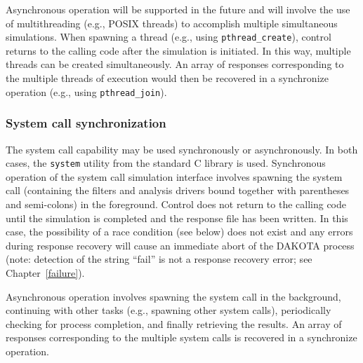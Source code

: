 Asynchronous operation will be supported in the future and will
involve the use of multithreading (e.g., POSIX threads) to accomplish
multiple simultaneous simulations. When spawning a thread (e.g., using
\texttt{pthread\_create}), control returns to the calling code after
the simulation is initiated. In this way, multiple threads can be
created simultaneously. An array of responses corresponding to the
multiple threads of execution would then be recovered in a synchronize
operation (e.g., using \texttt{pthread\_join}).

\subsubsection{System call synchronization}\label{parallel:SLP:local:system}

The system call capability may be used synchronously or
asynchronously. In both cases, the \texttt{system} utility from the
standard C library is used. Synchronous operation of the system call
simulation interface involves spawning the system call (containing
the filters and analysis drivers bound together with parentheses and
semi-colons) in the foreground. Control does not return to the calling
code until the simulation is completed and the response file has been
written. In this case, the possibility of a race condition (see below)
does not exist and any errors during response recovery will cause an
immediate abort of the DAKOTA process (note: detection of the string
``fail'' is not a response recovery error; see Chapter~\ref{failure}).

Asynchronous operation involves spawning the system call in the
background, continuing with other tasks (e.g., spawning other system
calls), periodically checking for process completion, and finally
retrieving the results. An array of responses corresponding to the
multiple system calls is recovered in a synchronize operation.

